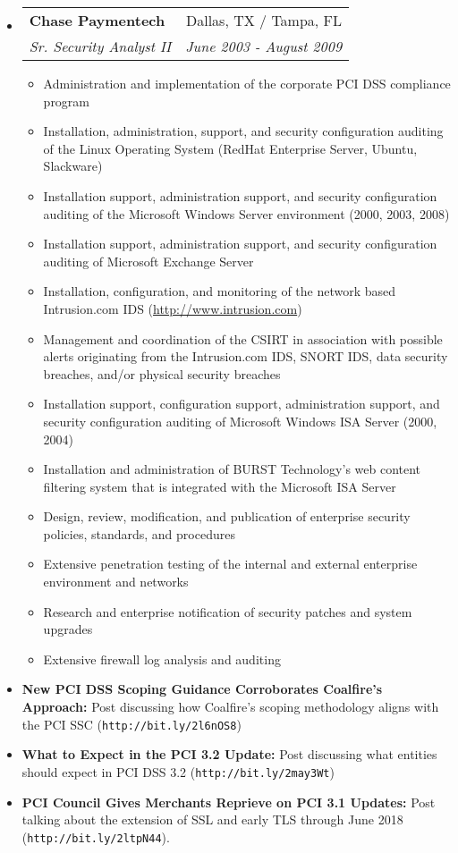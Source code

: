 \documentclass[letterpaper,11pt]{article}
\makeatletter
\newlength{\outerbordwidth}
\newcommand{\resitem}[1]{\item #1 \vspace{-2pt}}
\newcommand{\resheading}[1]{\vspace{8pt}
  \parbox{\textwidth}{\setlength{\FrameSep}{\outerbordwidth}
    \begin{shaded}

\setlength{\fboxsep}{0pt}\framebox[\textwidth][l]{\setlength{\fboxsep}{4pt}\fcolorbox{shadecolorB}{shadecolorB}{\textbf{\sffamily{\mbox{~}\makebox[6.762in][l]{\large #1} \vphantom{p\^{E}}}}}}
    \end{shaded}
  }\vspace{-5pt}
}
\newcommand{\ressubheading}[4]{
\begin{tabular*}{6.5in}{l@{\cftdotfill{\cftsecdotsep}\extracolsep{\fill}}r}
		\textbf{#1} & #2 \\
		\textit{#3} & \textit{#4} \\
\end{tabular*}\vspace{-6pt}}
\makeatother
\begin{document}
\begin{itemize}
\item 
	\ressubheading{Chase Paymentech}{Dallas, TX / Tampa, FL}{Sr. Security Analyst II}{June 2003 - August 2009}
	\begin{itemize}
	\resitem{Administration and implementation of the corporate PCI DSS compliance program}
    \resitem{Installation, administration, support, and security configuration auditing of the Linux Operating System (RedHat Enterprise Server, Ubuntu, Slackware)}
    \resitem{Installation support, administration support, and security configuration auditing of the Microsoft Windows Server environment (2000, 2003, 2008)}
    \resitem{Installation support, administration support, and security configuration auditing of Microsoft Exchange Server}
    \resitem{Installation, configuration, and monitoring of the network based Intrusion.com IDS (\url{http://www.intrusion.com})}
    \resitem{Management and coordination of the CSIRT in association with possible alerts originating from the Intrusion.com IDS, SNORT IDS, data security breaches, and/or physical security breaches}
    \resitem{Installation support, configuration support, administration support, and security configuration auditing of Microsoft Windows ISA Server (2000, 2004)}
    \resitem{Installation and administration of BURST Technology’s web content filtering system that is integrated with the Microsoft ISA Server}
    \resitem{Design, review, modification, and publication of enterprise security policies, standards, and procedures}
    \resitem{Extensive penetration testing of the internal and external enterprise environment and networks}
    \resitem{Research and enterprise notification of security patches and system upgrades}
    \resitem{Extensive firewall log analysis and auditing}
	\end{itemize}

\end{itemize}

\newpage

\resheading{Publications}

\begin{itemize}

\item {\bf New PCI DSS Scoping Guidance Corroborates Coalfire’s Approach:} Post discussing how Coalfire's scoping methodology aligns with the PCI SSC  (\texttt{http://bit.ly/2l6nOS8})
\item {\bf What to Expect in the PCI 3.2 Update:} Post discussing what entities should expect in PCI DSS 3.2 (\texttt{http://bit.ly/2may3Wt})
\item {\bf PCI Council Gives Merchants Reprieve on PCI 3.1 Updates:} Post talking about the extension of SSL and early TLS through June 2018 (\texttt{http://bit.ly/2ltpN44}).

\end{itemize}
\end{document}
